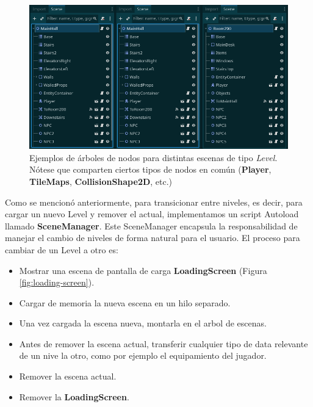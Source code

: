 \begin{figure}[htbp]
    \centering
    \includegraphics[width=1.0\textwidth]{../assets/levels-tree-nodes.png}
    \caption{Ejemplos de árboles de nodos para distintas escenas de tipo \textit{Level}. Nótese que
            comparten ciertos tipos de nodos en común (\textbf{Player}, \textbf{TileMaps},
            \textbf{CollisionShape2D}, etc.)}
    \label{fig:level-nodes}
\end{figure}

Como se mencionó anteriormente, para transicionar entre niveles, es decir, para cargar un nuevo Level
y remover el actual, implementamos un script Autoload llamado \textbf{SceneManager}.
Este SceneManager encapsula la responsabilidad de manejar el cambio de niveles de forma natural para 
el usuario. El proceso para cambiar de un Level a otro es:

\begin{itemize}
    \item Mostrar una escena de pantalla de carga \textbf{LoadingScreen} (Figura \ref{fig:loading-screen}).
    \item Cargar de memoria la nueva escena en un hilo separado.
    \item Una vez cargada la escena nueva, montarla en el arbol de escenas.
    \item Antes de remover la escena actual, transferir cualquier tipo de data relevante de un nive la otro,
    como por ejemplo el equipamiento del jugador.
    \item Remover la escena actual.
    \item Remover la \textbf{LoadingScreen}.
\end{itemize}

